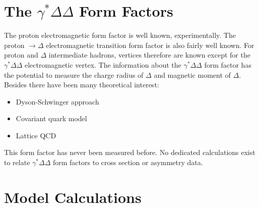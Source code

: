 \section{The $\gamma^{*}\Delta\Delta$ Form Factors}

The proton electromagnetic form factor is well known, experimentally. The proton $\rightarrow \Delta$ electromagnetic transition form factor is also fairly well known. 
For proton and $\Delta$ intermediate hadrons, vertices therefore are known except for the $\gamma^{*}\Delta\Delta$ electromagnetic vertex.
The information about the $\gamma^{*}\Delta\Delta$ form factor has the potential to measure the charge radius of $\Delta$ and magnetic moment of $\Delta$. Besides there have been many theoretical interest: 
\begin{itemize}
\item Dyson-Schwinger approach~\cite{Segovia2014}
\item Covariant quark model~\cite{PhysRevD.86.093022}
\item Lattice QCD~\cite{Alexandrou2009115}
\end{itemize}



This form factor has never been measured before. 
No dedicated calculations exist to relate $\gamma^{*}\Delta\Delta$ form factors to cross section or asymmetry data.


\section{Model Calculations}
\label{Model Calculations}

